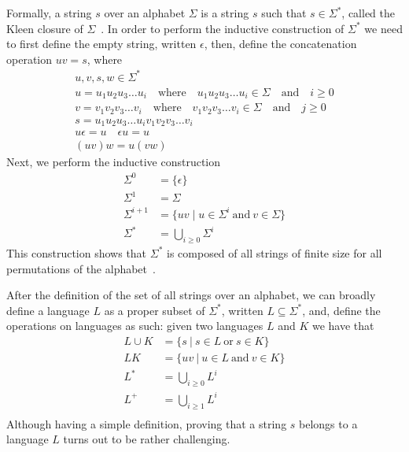 \documentclass[
  oneside,
  english,
  coorientadorbanca,
  noabntexcite
]{ufsc-thesis-rn46-2019}
\begin{document}
Formally, a string $s$ over an alphabet $\Sigma$ is a string $s$ such that $s \in \Sigma^*$, called the Kleen closure of $\Sigma$~\cite{HopcroftMotwaniUllman07}.
In order to perform the inductive construction of $\Sigma^*$ we need to first define the empty string, written $\epsilon$, then, define the concatenation operation $uv = s$, where
\begin{gather*}
  u, v, s, w \in \Sigma^* \\
  u = u_1 u_2 u_3 \dots u_i \quad \text{where} \quad u_1 u_2 u_3 \dots u_i \in \Sigma \quad \text{and} \quad i \geq 0\\
  v = v_1 v_2 v_3 \dots v_i \quad \text{where} \quad v_1 v_2 v_3 \dots v_i \in \Sigma \quad \text{and} \quad j \geq 0\\
  s = u_1 u_2 u_3 \dots u_i v_1 v_2 v_3 \dots v_i \\
  u\epsilon = u \quad \epsilon u = u\\
  (uv)w = u(vw)
\end{gather*}
Next, we perform the inductive construction
\begin{align*}
  \Sigma^0     & = \{ \epsilon \}                                           \\
  \Sigma^1     & = \Sigma                                                   \\
  \Sigma^{i+1} & = \{ uv \mid u \in \Sigma^{i}\ \text{and}\ v \in \Sigma \} \\
  \Sigma^*     & = \bigcup_{i \geq 0} \Sigma^i
\end{align*}
This construction shows that $\Sigma^*$ is composed of all strings of finite size for all permutations of the alphabet~\cite{HopcroftMotwaniUllman07}.

After the definition of the set of all strings over an alphabet, we can broadly define a language $L$ as a proper subset of $\Sigma^*$, written $L \subseteq \Sigma^*$, and, define the operations on languages as such: given two languages $L$ and $K$ we have that
\begin{align*}
  L \cup K & = \{ s\ |\ s \in L\ \text{or}\ s \in K \}   \\
  L K      & = \{ uv\ |\ u \in L\ \text{and}\ v \in K \} \\
  L^*      & = \bigcup_{i \geq 0} L^{i}                  \\
  L^+      & = \bigcup_{i \geq 1} L^{i}                  \\
\end{align*}
Although having a simple definition, proving that a string $s$ belongs to a language $L$ turns out to be rather challenging.
\end{document}
